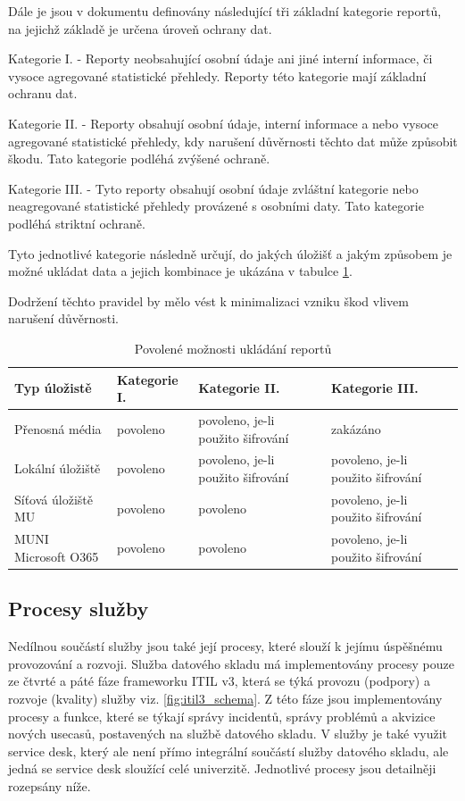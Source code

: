 \documentclass[
  digital,     %
  twoside,     %
  lof,         %
  lot,         %
]{fithesis4}
\begin{document}
Dále je jsou v dokumentu definovány následující tři základní kategorie reportů, na jejichž základě je určena úroveň ochrany dat.
\begin{compactitem}
    \item Kategorie I. -  Reporty neobsahující osobní údaje ani jiné interní informace, či vysoce agregované statistické přehledy. Reporty této kategorie mají základní ochranu dat.
    \item Kategorie II. - Reporty obsahují osobní údaje, interní informace a nebo vysoce agregované statistické přehledy, kdy narušení důvěrnosti těchto dat může způsobit škodu. Tato kategorie podléhá zvýšené ochraně.
    \item Kategorie III. - Tyto reporty obsahují osobní údaje zvláštní kategorie nebo neagregované statistické přehledy provázené s osobními daty. Tato kategorie podléhá striktní ochraně.
\end{compactitem}

Tyto jednotlivé kategorie následně určují, do jakých úložišť a jakým způsobem je možné ukládat data a jejich kombinace je ukázána v tabulce \ref{tab:security_storage}.

Dodržení těchto pravidel by mělo vést k minimalizaci vzniku škod vlivem narušení důvěrnosti.

\begin{table}
  \begin{tabularx}{\textwidth}{|p{2.5cm}|p{2.5cm}|p{2.5cm}|p{3.5cm}|}
    \toprule
    Typ úložistě & Kategorie I.  & Kategorie II. & Kategorie III. \\
    \midrule
    Přenosná média & povoleno & povoleno, je-li použito šifrování & zakázáno \\
    Lokální úložiště & povoleno & povoleno, je-li použito šifrování & povoleno, je-li použito šifrování \\
    Síťová úložiště MU & povoleno &
    povoleno & povoleno, je-li použito šifrování \\
    MUNI Microsoft O365 & povoleno &
    povoleno & povoleno, je-li použito šifrování \\
    \bottomrule
  \end{tabularx}
  \caption{Povolené možnosti ukládání reportů}
  \label{tab:security_storage}
\end{table}

\subsection{Procesy služby}
Nedílnou součástí služby jsou také její procesy, které slouží k jejímu úspěšnému provozování a rozvoji. Služba datového skladu má implementovány procesy pouze ze čtvrté a páté fáze frameworku ITIL v3, která se týká provozu (podpory)  a rozvoje (kvality) služby viz. \ref{fig:itil3_schema}. Z této fáze jsou implementovány procesy a funkce, které se týkají správy incidentů, správy problémů a akvizice nových usecasů, postavených na službě datového skladu. V služby je také využit service desk, který ale není přímo integrální součástí služby datového skladu, ale jedná se service desk sloužící celé univerzitě. Jednotlivé procesy jsou detailněji rozepsány níže.
\end{document}
